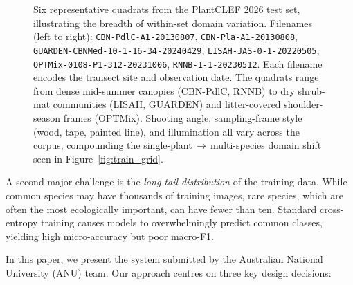 \begin{figure}[t]
  \centering
  \resizebox{0.92\linewidth}{!}{}
  \caption{Six representative quadrats from the PlantCLEF 2026 test set, illustrating the breadth of within-set domain variation. Filenames (left to right): \texttt{CBN-PdlC-A1-20130807}, \texttt{CBN-Pla-A1-20130808}, \texttt{GUARDEN-CBNMed-10-1-16-34-20240429}, \texttt{LISAH-JAS-0-1-20220505}, \texttt{OPTMix-0108-P1-312-20231006}, \texttt{RNNB-1-1-20230512}. Each filename encodes the transect site and observation date. The quadrats range from dense mid-summer canopies (CBN-PdlC, RNNB) to dry shrub-mat communities (LISAH, GUARDEN) and litter-covered shoulder-season frames (OPTMix). Shooting angle, sampling-frame style (wood, tape, painted line), and illumination all vary across the corpus, compounding the single-plant\,$\to$\,multi-species domain shift seen in Figure~\ref{fig:train_grid}.}
  \label{fig:quadrats}
\end{figure}

A second major challenge is the \emph{long-tail distribution} of the training data. While common species may have thousands of training images, rare species, which are often the most ecologically important, can have fewer than ten. Standard cross-entropy training causes models to overwhelmingly predict common classes, yielding high micro-accuracy but poor macro-F1.

In this paper, we present the system submitted by the Australian National University (ANU) team. Our approach centres on three key design decisions:

